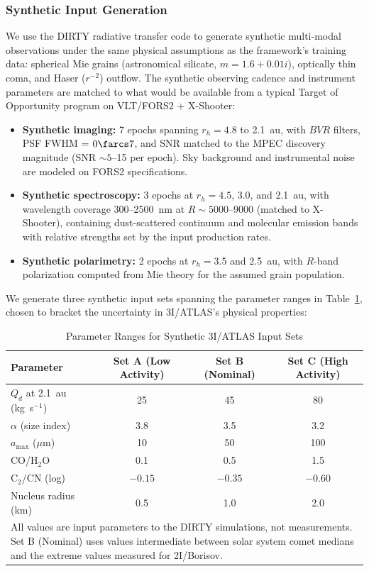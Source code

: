 \documentclass[usenatbib]{mnras}
\begin{document}
\subsubsection{Synthetic Input Generation}

We use the DIRTY radiative transfer code \citep{gordon01} to generate synthetic multi-modal observations under the same physical assumptions as the framework's training data: spherical Mie grains (astronomical silicate, $m = 1.6 + 0.01i$), optically thin coma, and Haser ($r^{-2}$) outflow. The synthetic observing cadence and instrument parameters are matched to what would be available from a typical Target of Opportunity program on VLT/FORS2 + X-Shooter:

\begin{itemize}
    \item \textbf{Synthetic imaging:} 7 epochs spanning $r_h = 4.8$ to 2.1~au, with $BVR$ filters, PSF FWHM = $0\farcs7$, and SNR matched to the MPEC discovery magnitude (SNR $\sim 5$--15 per epoch). Sky background and instrumental noise are modeled on FORS2 specifications.
    \item \textbf{Synthetic spectroscopy:} 3 epochs at $r_h = 4.5$, 3.0, and 2.1~au, with wavelength coverage 300--2500~nm at $R \sim 5000$--$9000$ (matched to X-Shooter), containing dust-scattered continuum and molecular emission bands with relative strengths set by the input production rates.
    \item \textbf{Synthetic polarimetry:} 2 epochs at $r_h = 3.5$ and 2.5~au, with $R$-band polarization computed from Mie theory for the assumed grain population.
\end{itemize}

We generate three synthetic input sets spanning the parameter ranges in Table~\ref{tab:synthetic_params}, chosen to bracket the uncertainty in 3I/ATLAS's physical properties:

\begin{table}
\centering
\caption{Parameter Ranges for Synthetic 3I/ATLAS Input Sets\label{tab:synthetic_params}}
\begin{tabular}{lccc}
\toprule
Parameter & Set A (Low Activity) & Set B (Nominal) & Set C (High Activity) \\
\midrule
$Q_d$ at 2.1~au (kg~s$^{-1}$) & 25 & 45 & 80 \\
$\alpha$ (size index) & 3.8 & 3.5 & 3.2 \\
$a_{\max}$ ($\mu$m) & 10 & 50 & 100 \\
CO/H$_2$O & 0.1 & 0.5 & 1.5 \\
C$_2$/CN (log) & $-0.15$ & $-0.35$ & $-0.60$ \\
Nucleus radius (km) & 0.5 & 1.0 & 2.0 \\
\bottomrule
\multicolumn{4}{l}{\small All values are input parameters to the DIRTY simulations, not measurements. Set B (Nominal) uses values intermediate between solar system comet medians and the extreme values measured for 2I/Borisov.}
\end{tabular}
\end{table}
\end{document}
